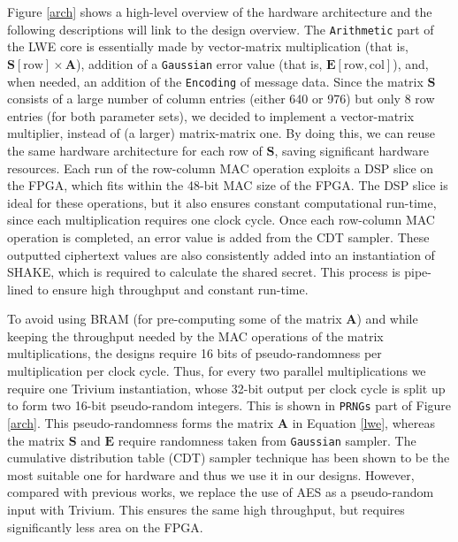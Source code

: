 Figure \ref{arch} shows a high-level overview of the hardware architecture and the following descriptions will link to the design overview. The \texttt{Arithmetic} part of the LWE core is essentially made by vector-matrix multiplication (that is, $\mathbf{S}[\text{row}]\times \mathbf{A}$), addition of a \texttt{Gaussian} error value (that is, $\mathbf{E}[\text{row},\text{col}]$), and, when needed, an addition of the \texttt{Encoding} of message data. Since the matrix $\mathbf{S}$ consists of a large number of column entries (either 640 or 976) but only 8 row entries (for both parameter sets), we decided to implement a vector-matrix multiplier, instead of (a larger) matrix-matrix one. By doing this, we can reuse the same hardware architecture for each row of $\mathbf{S}$, saving significant hardware resources. Each run of the row-column MAC operation exploits a DSP slice on the FPGA, which fits within the 48-bit MAC size of the FPGA. The DSP slice is ideal for these operations, but it also ensures constant computational run-time, since each multiplication requires one clock cycle. Once each row-column MAC operation is completed, an error value is added from the CDT sampler. These outputted ciphertext values are also consistently added into an instantiation of SHAKE, which is required to calculate the shared secret. This process is pipe-lined to ensure high throughput and constant run-time. 


To avoid using BRAM (for pre-computing some of the matrix $\mathbf{A}$) and while keeping the throughput needed by the MAC operations of the matrix multiplications, the designs require 16 bits of pseudo-randomness per multiplication per clock cycle. Thus, for every two parallel multiplications we require one Trivium instantiation, whose 32-bit output per clock cycle is split up to form two 16-bit pseudo-random integers. This is shown in \texttt{PRNGs} part of Figure \ref{arch}. This pseudo-randomness forms the matrix $\mathbf{A}$ in Equation \ref{lwe}, whereas the matrix $\mathbf{S}$ and $\mathbf{E}$ require randomness taken from \texttt{Gaussian} sampler. The cumulative distribution table (CDT) sampler technique has been shown to be the most suitable one for hardware \cite{howe2018practical} and thus we use it in our designs. However, compared with previous works, we replace the use of AES as a pseudo-random input with Trivium. This ensures the same high throughput, but requires significantly less area on the FPGA.

